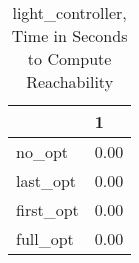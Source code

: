 \begin{table}
\caption{light\_controller, Time in Seconds to Compute Reachability}
\label{light_controller_states_time}
\begin{tabular}{ll}
\toprule
 & 1 \\
\midrule
no\_opt & 0.00 \\
last\_opt & 0.00 \\
first\_opt & 0.00 \\
full\_opt & 0.00 \\
\bottomrule
\end{tabular}
\end{table}

